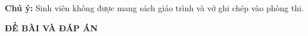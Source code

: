 \documentclass[11pt]{article}
\begin{document}
\lamtieude

\hideanswers

\begin{enumerate}[]
\foreachproblem[btdungsai]{\item\causo\thisproblem}
\end{enumerate}

\vspace*{1cm}
{\bf Chú ý:} Sinh viên không được mang sách giáo trình và vở ghi chép vào phòng thi.


\newpage
\setcounter{page}{1}
\lamtieude
\begin{center}
{\bf ĐỀ BÀI VÀ ĐÁP ÁN }
\end{center}

\medskip
{}
\indebailoigiai
\begin{enumerate}[]
\foreachproblem[btdungsai]{\item\causo\thisproblem}
\end{enumerate}
\end{document}
